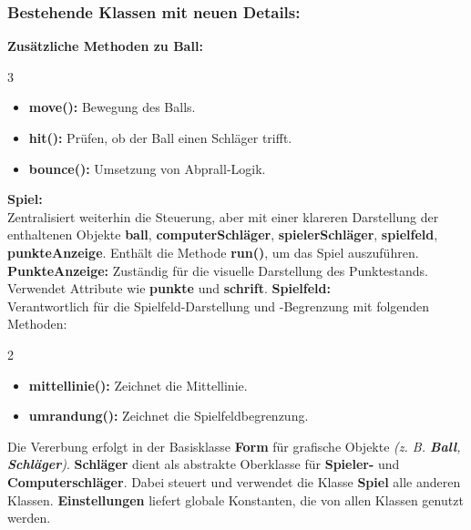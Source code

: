 \documentclass[a4paper,12pt]{article}
\begin{document}
\subsubsection{Bestehende Klassen mit neuen Details:}
\textbf{Zusätzliche Methoden zu Ball:}
\vspace{-0.9\baselineskip}
\begin{multicols}{3}
\begin{itemize}[label={},leftmargin=*,noitemsep,topsep=0pt,parsep=0pt]
    \item \textbf{move():} Bewegung des Balls.
    \columnbreak
    \item \textbf{hit():} Prüfen, ob der Ball einen Schläger trifft.
    \columnbreak 
    \item \textbf{bounce():} Umsetzung von Abprall-Logik.
\end{itemize}
\end{multicols}
\vspace{-0.9\baselineskip}
\noindent
\textbf{Spiel:} \\ Zentralisiert weiterhin die Steuerung, aber mit einer klareren Darstellung der enthaltenen Objekte \textbf{ball}, \textbf{computerSchläger}, \textbf{spielerSchläger}, \textbf{spielfeld}, \textbf{punkteAnzeige}. Enthält die Methode \textbf{run()}, um das Spiel auszuführen.
\noindent
\textbf{PunkteAnzeige:} Zuständig für die visuelle Darstellung des Punktestands. Verwendet Attribute wie \textbf{punkte} und \textbf{schrift}.
\noindent
\textbf{Spielfeld:} \\ Verantwortlich für die Spielfeld-Darstellung und -Begrenzung mit folgenden Methoden:
\vspace{-0.9\baselineskip}
\begin{multicols}{2}
\begin{itemize}[label={},leftmargin=*,noitemsep,topsep=0pt,parsep=0pt]
    \item \textbf{mittellinie():} Zeichnet die Mittellinie.
    \columnbreak
    \item \textbf{umrandung():} Zeichnet die Spielfeldbegrenzung.
\end{itemize}
\end{multicols}
Die Vererbung erfolgt in der Basisklasse \textbf{Form} für grafische Objekte \textit{(z. B. \textbf{Ball}, \textbf{Schläger})}. \textbf{Schläger} dient als abstrakte Oberklasse für \textbf{Spieler-} und \textbf{Computerschläger}. Dabei steuert und verwendet die Klasse \textbf{Spiel} alle anderen Klassen. \textbf{Einstellungen} liefert globale Konstanten, die von allen Klassen genutzt werden.
\end{document}
